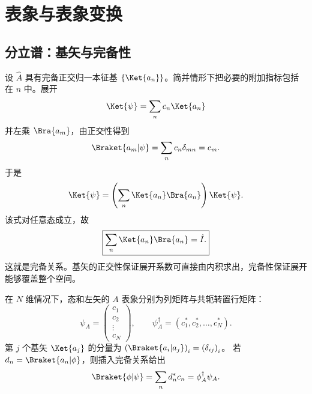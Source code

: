 \section{表象与表象变换}
\subsection{分立谱：基矢与完备性}
设 $\hat A$ 具有完备正交归一本征基 $\left\{\Ket{a_n}\right\}$。简并情形下把必要的附加指标包括在 $n$ 中。展开
\begin{equation}
\Ket{\psi}=\sum_n c_n\Ket{a_n}
\end{equation}
并左乘 $\Bra{a_m}$，由正交性得到
\begin{equation}
\Braket{a_m|\psi}=\sum_n c_n\delta_{mn}=c_m.
\end{equation}
于是
\begin{equation}
\Ket{\psi}=\left(\sum_n\Ket{a_n}\Bra{a_n}\right)\Ket{\psi}.
\end{equation}
该式对任意态成立，故
\begin{equation}
\boxed{\sum_n\Ket{a_n}\Bra{a_n}=\hat I.}
\label{eq:discrete-complete}
\end{equation}
这就是完备关系。基矢的正交性保证展开系数可直接由内积求出，完备性保证展开能够覆盖整个空间。

在 $N$ 维情况下，态和左矢的 $A$ 表象分别为列矩阵与共轭转置行矩阵：
\begin{equation}
\psi_A=\left(\begin{matrix}c_1\\c_2\\\vdots\\c_N\end{matrix}\right),\qquad
\psi_A^\dagger=\left(c_1^*,c_2^*,\ldots,c_N^*\right).
\end{equation}
第 $j$ 个基矢 $\Ket{a_j}$ 的分量为 $\left(\Braket{a_i|a_j}\right)_i=\left(\delta_{ij}\right)_i$。
若 $d_n=\Braket{a_n|\phi}$，则插入完备关系给出
\begin{equation}
\Braket{\phi|\psi}=\sum_n d_n^*c_n=\phi_A^\dagger\psi_A.
\end{equation}

